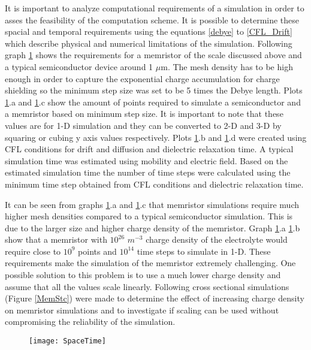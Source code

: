 It is important to analyze computational requirements of a simulation in order to asses the feasibility of the computation scheme. It is possible to determine these spacial and temporal requirements using the equations \ref{debye} to \ref{CFL_Drift} which describe physical and numerical limitations of the simulation. Following graph \ref{SpaceTime} shows the requirements for a memristor of the scale discussed above and a typical semiconductor device around 1 $\mu$m. The mesh density has to be high enough in order to capture the exponential charge accumulation for charge shielding so the minimum step size was set to be 5 times the Debye length. Plots \ref{SpaceTime}.a and \ref{SpaceTime}.c show the amount of points required to simulate a semiconductor and a memristor based on minimum step size. It is important to note that these values are for 1-D simulation and they can be converted to 2-D and 3-D by squaring or cubing y axis values respectively. Plots \ref{SpaceTime}.b and \ref{SpaceTime}.d were created using CFL conditions for drift and diffusion and dielectric relaxation time. A typical simulation time was estimated using mobility and electric field. Based on the estimated simulation time the number of time steps were calculated using the minimum time step obtained from CFL conditions and dielectric relaxation time.

It can be seen from graphs \ref{SpaceTime}.a and \ref{SpaceTime}.c that memristor simulations require much higher mesh densities compared to a typical semiconductor simulation. This is due to the larger size and higher charge density of the memristor. Graph \ref{SpaceTime}.a \ref{SpaceTime}.b show that a memristor with $10^{26}$ $m^{-3}$ charge density of the electrolyte would require close to $10^9$ points and $10^{14}$ time steps to simulate in 1-D. These requirements make the simulation of the memristor extremely challenging. One possible solution to this problem is to use a much lower charge density and assume that all the values scale linearly. Following cross sectional simulations (Figure \ref{MemStc}) were made to determine the effect of increasing charge density on memristor simulations and to investigate if scaling can be used without compromising the reliability of the simulation.

\begin{landscape}
\begin{figure}[htp]
\centering
\texttt{[image: SpaceTime]}
\caption{} 
\label{SpaceTime}
\end{figure}
\end{landscape}

